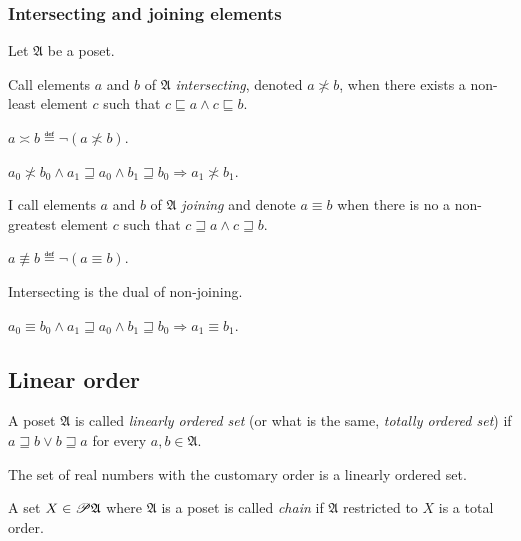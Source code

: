 \subsubsection{Intersecting and joining elements}

Let $\mathfrak{A}$ be a poset.
\begin{defn}
Call elements $a$ and $b$ of $\mathfrak{A}$
\emph{intersecting}, denoted $a\nasymp b$, when there exists a non-least
element $c$ such that $c\sqsubseteq a\land c\sqsubseteq b$.
\end{defn}

\begin{defn}
$a\asymp b\eqdef\lnot(a\nasymp b)$.\end{defn}
\begin{obvious}
$a_{0}\nasymp b_{0}\land a_{1}\sqsupseteq a_{0}\land b_{1}\sqsupseteq b_{0}\Rightarrow a_{1}\nasymp b_{1}$.\end{obvious}
\begin{defn}
I call elements $a$ and $b$ of $\mathfrak{A}$
\emph{joining} and denote $a\equiv b$ when there is no a non-greatest
element $c$ such that $c\sqsupseteq a\land c\sqsupseteq b$.
\end{defn}

\begin{defn}
$a\nequiv b\eqdef\lnot(a\equiv b)$.\end{defn}
\begin{obvious}
Intersecting is the dual of non-joining.
\end{obvious}

\begin{obvious}
$a_{0}\equiv b_{0}\land a_{1}\sqsupseteq a_{0}\land b_{1}\sqsupseteq b_{0}\Rightarrow a_{1}\equiv b_{1}$.
\end{obvious}

\subsection{Linear order}
\begin{defn}
A poset $\mathfrak{A}$ is called \emph{linearly
ordered set} (or what is the same, \emph{totally ordered set}) if
$a\sqsupseteq b\lor b\sqsupseteq a$ for every $a,b\in\mathfrak{A}$.\end{defn}
\begin{example}
The set of real numbers with the customary order is a linearly ordered
set.\end{example}
\begin{defn}
A set $X\in\mathscr{P}\mathfrak{A}$ where $\mathfrak{A}$
is a poset is called \emph{chain} if $\mathfrak{A}$ restricted to
$X$ is a total order.
\end{defn}

